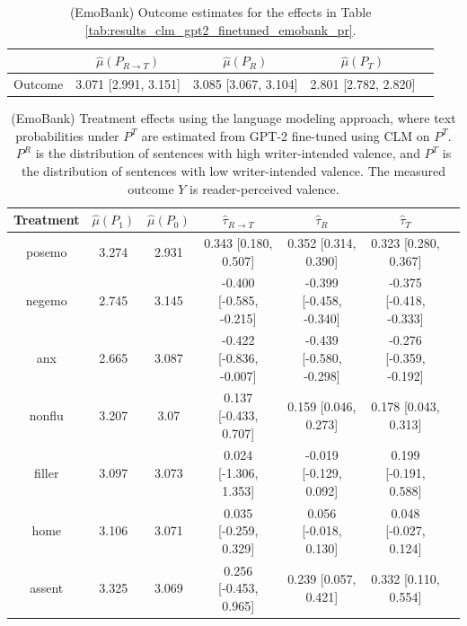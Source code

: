 \documentclass{article}
\begin{document}
\begin{table}[!ht]
\centering
\begin{tabular}{c|cccc}
\toprule
    & $\hat{\mu}(P_{R \rightarrow T})$   & $\hat{\mu}(P_R)$     & $\hat{\mu}(P_T)$     \\
\midrule
    Outcome & 3.071 [2.991, 3.151]               & 3.085 [3.067, 3.104] & 2.801 [2.782, 2.820] \\
\bottomrule
\end{tabular}
\caption{(EmoBank) Outcome estimates for the effects in Table \ref{tab:results_clm_gpt2_finetuned_emobank_pr}.}
\label{tab:results_clm_gpt2_finetuned_emobank_pr_outcome}
\end{table}

\begin{table}[!ht]
\centering
\begin{tabular}{c|cccccc}
\toprule
    Treatment   &   $\hat{\mu}(P_1)$ &   $\hat{\mu}(P_0)$ & $\hat{\tau}_{R \rightarrow T}$   & $\hat{\tau}_R$          & $\hat{\tau}_T$          \\
\midrule
    posemo      &              3.274 &              2.931 & 0.343 [0.180, 0.507]             & 0.352 [0.314, 0.390]    & 0.323 [0.280, 0.367]    \\
    negemo      &              2.745 &              3.145 & -0.400 [-0.585, -0.215]          & -0.399 [-0.458, -0.340] & -0.375 [-0.418, -0.333] \\
    anx         &              2.665 &              3.087 & -0.422 [-0.836, -0.007]          & -0.439 [-0.580, -0.298] & -0.276 [-0.359, -0.192] \\
    nonflu      &              3.207 &              3.07  & 0.137 [-0.433, 0.707]            & 0.159 [0.046, 0.273]    & 0.178 [0.043, 0.313]    \\
    filler      &              3.097 &              3.073 & 0.024 [-1.306, 1.353]            & -0.019 [-0.129, 0.092]  & 0.199 [-0.191, 0.588]   \\
    home        &              3.106 &              3.071 & 0.035 [-0.259, 0.329]            & 0.056 [-0.018, 0.130]   & 0.048 [-0.027, 0.124]   \\
    assent      &              3.325 &              3.069 & 0.256 [-0.453, 0.965]            & 0.239 [0.057, 0.421]    & 0.332 [0.110, 0.554]    \\
\bottomrule
\end{tabular}
\caption{(EmoBank) Treatment effects using the language modeling approach, where text probabilities under $P^T$ are estimated from GPT-2 fine-tuned using CLM on $P^T$. $P^R$ is the distribution of sentences with high writer-intended valence, and $P^T$ is the distribution of sentences with low writer-intended valence. The measured outcome $Y$ is reader-perceived valence.}
\label{tab:results_clm_gpt2_finetuned_emobank_pt}
\end{table}
\end{document}
